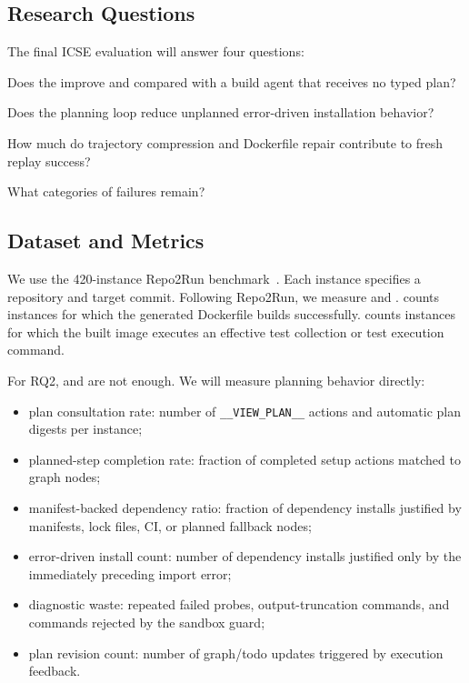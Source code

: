\subsection{Research Questions}

The final ICSE evaluation will answer four questions:

\begin{description}[labelwidth=3em,leftmargin=4em,align=left]
  \item[RQ1:] Does the \ttg improve \dgsr and \ebsr compared with a build agent that receives no typed plan?
  \item[RQ2:] Does the planning loop reduce unplanned error-driven installation behavior?
  \item[RQ3:] How much do trajectory compression and Dockerfile repair contribute to fresh replay success?
  \item[RQ4:] What categories of failures remain?
\end{description}

\subsection{Dataset and Metrics}

We use the 420-instance Repo2Run benchmark~\cite{hu2025repo2run}.
Each instance specifies a repository and target commit.
Following Repo2Run, we measure \dgsr and \ebsr.
\dgsr counts instances for which the generated Dockerfile builds successfully.
\ebsr counts instances for which the built image executes an effective test collection or test execution command.

For RQ2, \dgsr and \ebsr are not enough.
We will measure planning behavior directly:

\begin{itemize}[leftmargin=*]
  \item plan consultation rate: number of \texttt{\_\_VIEW\_PLAN\_\_} actions and automatic plan digests per instance;
  \item planned-step completion rate: fraction of completed setup actions matched to graph nodes;
  \item manifest-backed dependency ratio: fraction of dependency installs justified by manifests, lock files, CI, or planned fallback nodes;
  \item error-driven install count: number of dependency installs justified only by the immediately preceding import error;
  \item diagnostic waste: repeated failed probes, output-truncation commands, and commands rejected by the sandbox guard;
  \item plan revision count: number of graph/todo updates triggered by execution feedback.
\end{itemize}

